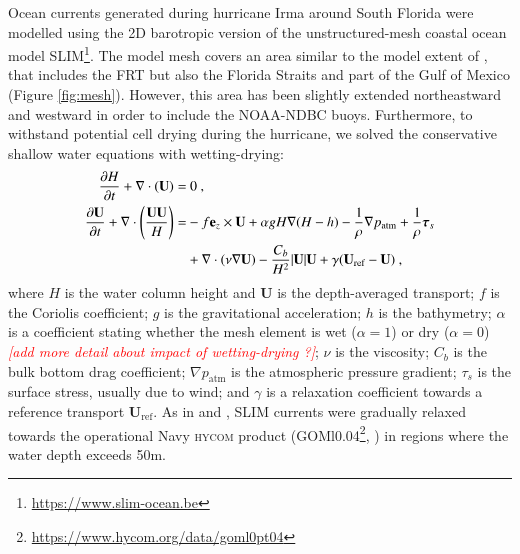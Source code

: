 \documentclass[preprint,12pt,authoryear]{elsarticle}
\newcommand{\emphc}[1]{\emph{\textcolor{red}{#1}}}
\newcommand{\hycom}{\textsc{hycom} }
\newcommand{\UV}{\mathbf{U}}
\begin{document}
Ocean currents generated during hurricane Irma around South Florida were modelled using the 2D barotropic version of the unstructured-mesh coastal ocean model SLIM\footnote{\url{https://www.slim-ocean.be}}. The model mesh covers an area similar to the model extent of \cite{dobbelaere2020coupled}, that includes the FRT but also the Florida Straits and part of the Gulf of Mexico (Figure \ref{fig:mesh}). However, this area has been slightly extended northeastward and westward in order to include the NOAA-NDBC buoys. Furthermore, to withstand potential cell drying during the hurricane, we solved the conservative shallow water equations with wetting-drying:
\begin{equation}
    \begin{split}
        \dfrac{\partial H}{\partial t} +\nabla\cdot(\UV) =& ~0~, \\
        \dfrac{\partial \UV}{\partial t}  + \nabla\cdot\left(\dfrac{\UV\UV}{H}\right) =& -f\mathbf{e}_z \times \UV + \alpha gH\nabla(H-h) - \dfrac{1}{\rho}\nabla p_\text{atm} + \dfrac{1}{\rho}\text{\boldmath$\tau$}_s \\
         &+\nabla\cdot(\nu\nabla\UV) - \dfrac{C_b}{H^2}|\UV|\UV + \gamma(\UV_\text{ref}-\UV)~,
    \end{split} \label{eq:slim}
\end{equation}
where $H$ is the water column height and $\UV$ is the depth-averaged transport; $f$ is the Coriolis coefficient; $g$ is the gravitational acceleration; $h$ is the bathymetry; $\alpha$ is a coefficient stating whether the mesh element is wet ($\alpha=1$) or dry ($\alpha=0$) \emphc{[add more detail about impact of wetting-drying ?]}; $\nu$  is the viscosity; $C_b$ is the bulk bottom drag coefficient; $\nabla p_\text{atm}$ is the atmospheric pressure gradient; {\boldmath$\tau$}$_s$ is the surface stress, usually due to wind; and $\gamma$ is a relaxation coefficient towards a reference transport $\UV_\text{ref}$. As in \cite{frys2020fine} and \cite{dobbelaere2020coupled}, SLIM currents were gradually relaxed towards the operational Navy \hycom product (GOMl0.04\footnote{\url{https://www.hycom.org/data/goml0pt04}}, \cite{chassignet2007hycom}) in regions where the water depth exceeds 50m.
\end{document}
